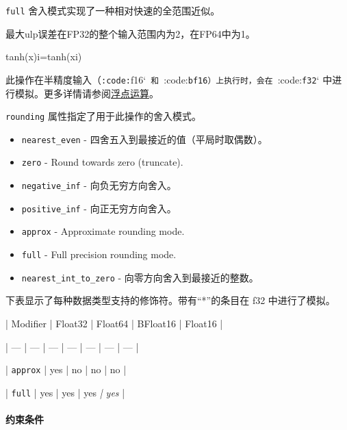 \documentclass{article}
\begin{document}
\texttt{full} 舍入模式实现了一种相对快速的全范围近似。

最大ulp误差在FP32的整个输入范围内为2，在FP64中为1。



tanh(x)i=tanh(xi)


此操作在半精度输入（\texttt{:code:}f16`\texttt{ 和 }:code:\texttt{bf16}\texttt{）上执行时，会在 }:code:\texttt{f32}` 中进行模拟。更多详情请参阅\href{https://docs.nvidia.com/cuda/tile-ir/latest/sections/operations.html#op-group-floating-point}{浮点运算}。



\texttt{rounding} 属性指定了用于此操作的舍入模式。



\begin{itemize}
\item \texttt{nearest\_even} - 四舍五入到最接近的值（平局时取偶数）。
\item \texttt{zero} - Round towards zero (truncate).

\item \texttt{negative\_inf} - 向负无穷方向舍入。
\item \texttt{positive\_inf} - 向正无穷方向舍入。
\item \texttt{approx} - Approximate rounding mode.

\item \texttt{full} - Full precision rounding mode.

\item \texttt{nearest\_int\_to\_zero} - 向零方向舍入到最接近的整数。


\end{itemize}
下表显示了每种数据类型支持的修饰符。带有``*''的条目在 f32 中进行了模拟。



| Modifier | Float32 | Float64 | BFloat16 | Float16 |


| --- | --- | --- | --- | --- | --- | --- |


| \texttt{approx} | yes | no | no | no |


| \texttt{full} | yes | yes | yes\textit{ | yes} |






\paragraph{约束条件}
\end{document}
